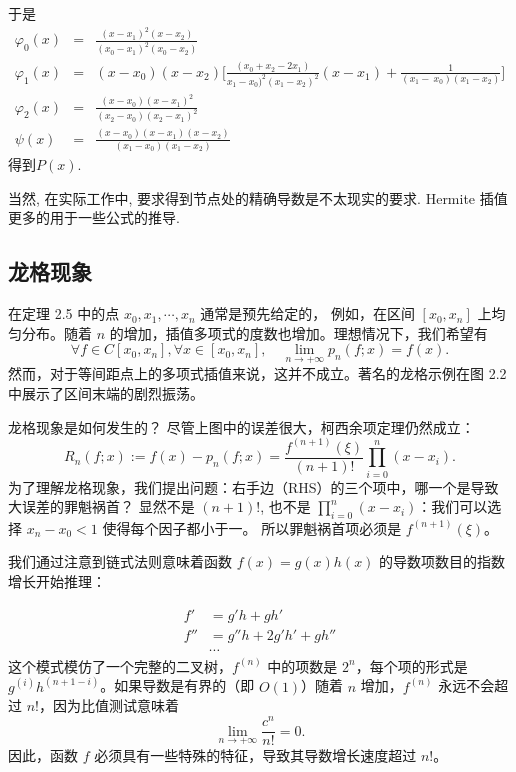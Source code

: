 \documentclass[a4paper]{ctexart}
\begin{document}
于是                                                                                     
\begin{eqnarray*}                                                                                            
\varphi_0(x)&=&\frac{(x-x_1)^2(x-x_2)}{(x_0-x_1)^2(x_0-x_2)}\\                                       
\varphi_1(x)&=&(x-x_0)(x-x_2)\Big[\frac{(x_0+x_2-2x_1)}{x_1-x_0)^2(x_1-x_2)^2}(x-x_1)+\frac{1}{(x_1-\
x_0)(x_1-x_2)}\Big]\\                                                                               
\varphi_2(x)&=&\frac{(x-x_0)(x-x_1)^2}{(x_2-x_0)(x_2-x_1)^2}\\                                       
\psi(x)&=&\frac{(x-x_0)(x-x_1)(x-x_2)}{(x_1-x_0)(x_1-x_2)}                                           
\end{eqnarray*}                                                                                                  
得到$P(x)$.

当然, 在实际工作中, 要求得到节点处的精确导数是不太现实的要求. Hermite 插值
更多的用于一些公式的推导.

\subsection{龙格现象}

 在定理 2.5 中的点 $x_0 , x_1 , \cdots , x_n$ 通常是预先给定的，
例如，在区间 $[x_0 , x_n]$ 上均匀分布。随着 $n$ 的增加，插值多项式的度数也增加。理想情况下，我们希望有
\[
\forall f \in C[x_0, x_n], \forall x \in [x_0 , x_n], \quad \lim_{n \to +\infty} p_n (f ; x) = f (x).
\]
然而，对于等间距点上的多项式插值来说，这并不成立。著名的龙格示例在图 2.2 中展示了区间末端的剧烈振荡。

 龙格现象是如何发生的？
尽管上图中的误差很大，柯西余项定理仍然成立：
\[
R_n (f ; x) := f (x) - p_n (f ; x) = \frac{f^{(n+1)}(\xi)}{(n + 1)!} \prod_{i=0}^{n} (x - x_i).
\]
为了理解龙格现象，我们提出问题：右手边（RHS）的三个项中，哪一个是导致大误差的罪魁祸首？
显然不是 $(n + 1)!$, 也不是 $\prod_{i=0}^{n} (x - x_i)$：我们可以选择 $x_n - x_0 < 1$ 使得每个因子都小于一。
所以罪魁祸首项必须是 $f^{(n+1)}(\xi)$。

我们通过注意到链式法则意味着函数 $f(x) = g(x)h(x)$ 的导数项数目的指数增长开始推理：

\begin{align*}
f' &= g' h + gh' \\
f'' &= g'' h + 2g' h' + gh'' \\
&\cdots
\end{align*}
这个模式模仿了一个完整的二叉树，$f^{(n)}$ 中的项数是 $2^n$，每个项的形式是 $g^{(i)} h^{(n+1-i)}$。如果导数是有界的（即 $O(1)$）随着 $n$ 增加，$f^{(n)}$ 永远不会超过 $n!$，因为比值测试意味着
\[
\lim_{n \to +\infty} \frac{c^n}{n!} = 0.
\]
因此，函数 $f$ 必须具有一些特殊的特征，导致其导数增长速度超过 $n!$。
\end{document}
